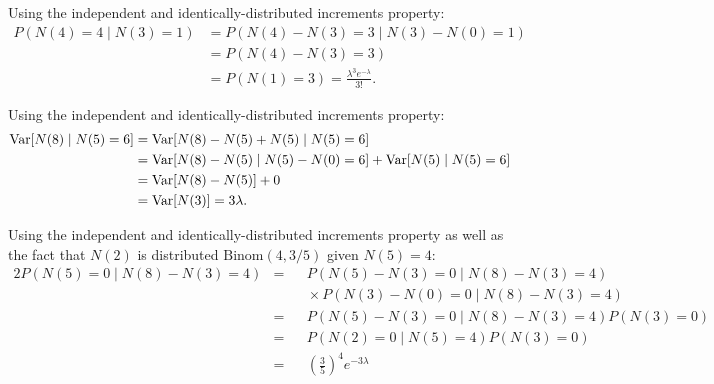 \documentclass{homework}
\begin{document}
	
	\begin{alphaparts}
		\questionpart Using the independent and identically-distributed increments property:
		\begin{align*}
			P(N(4) = 4 \mid N(3) = 1) &= P(N(4) - N(3) = 3 \mid N(3) - N(0) = 1) \\
			&= P(N(4) - N(3) = 3) \\
			&= P(N(1) = 3) = \frac{\lambda^3e^{-\lambda}}{3!}.
		\end{align*}
		
		\questionpart Using the independent and identically-distributed increments property:
		\begin{align*}
			\mathrm{Var}[N(8) \mid N(5)=6] &= \mathrm{Var}[N(8) - N(5) + N(5) \mid N(5)=6] \\
			&= \mathrm{Var}[N(8)-N(5) \mid N(5)-N(0)=6] + \mathrm{Var}[N(5) \mid N(5) = 6] \\
			&= \mathrm{Var}[N(8) - N(5)] + 0 \\
			&= \mathrm{Var}[N(3)] = 3\lambda.
		\end{align*}
		
		\questionpart Using the independent and identically-distributed increments property as well as the fact that $N(2)$ is distributed $\mathrm{Binom}(4, 3/5)$ given $N(5)=4$:
		\begin{alignat*}{2}
			P(N(5) =0 \mid N(8) - N(3) = 4) &={}&& P(N(5) - N(3) =0 \mid N(8) - N(3) = 4) \\
			&&&{}\times P(N(3) - N(0) = 0 \mid N(8) - N(3) = 4) \\
			&={}&& P(N(5) - N(3) = 0 \mid N(8) - N(3) = 4)P(N(3) = 0) \\
			&={}&& P(N(2) = 0 \mid N(5) = 4)P(N(3) = 0) \\
			&={}&& \left(\frac{3}{5}\right)^4e^{-3\lambda}
		\end{alignat*}
	\end{alphaparts}
	
\end{document}
